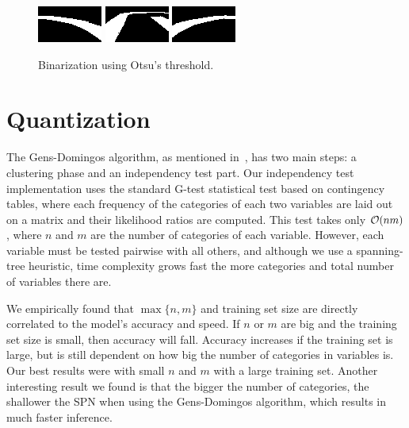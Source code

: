 \begin{figure}[h]
  \centering
  \includegraphics[scale=1.75]{imgs/binary_left.png}
  \includegraphics[scale=1.75]{imgs/binary_up.png}
  \includegraphics[scale=1.75]{imgs/binary_right.png}
  \caption{Binarization using Otsu's threshold.\label{fig:bin-otsu}}
\end{figure}

\section{Quantization}

The Gens-Domingos algorithm, as mentioned in~, has two main steps: a
clustering phase and an independency test part. Our independency test implementation uses the
standard G-test statistical test based on contingency tables, where each frequency of the
categories of each two variables are laid out on a matrix and their likelihood ratios are computed.
This test takes only $\mathcal{O}(n m)$, where $n$ and $m$ are the number of categories of each variable.
However, each variable must be tested pairwise with all others, and although we use a spanning-tree
heuristic, time complexity grows fast the more categories and total number of variables there are.

We empirically found that $\max\{n,m\}$ and training set size are directly correlated to the
model's accuracy and speed. If $n$ or $m$ are big and the training set size is small, then accuracy
will fall. Accuracy increases if the training set is large, but is still dependent on how big the
number of categories in variables is. Our best results were with small $n$ and $m$ with a large
training set. Another interesting result we found is that the bigger the number of categories, the
shallower the SPN when using the Gens-Domingos algorithm, which results in much faster inference.

